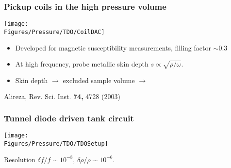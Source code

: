 \begin{frame}[label=DACcoil]
\frametitle{Pickup coils in the high pressure volume}

\centerline{\texttt{[image: \\Figures/Pressure/TDO/CoilDAC]}}
\begin{itemize}
\item
Developed for magnetic susceptibility measurements, filling factor $\sim 0.3$

\item
At high frequency, probe metallic skin depth $s \propto
\sqrt{\rho/\omega}$.

\item 
Skin depth $\rightarrow$ excluded sample volume $\rightarrow$ \\ 
\end{itemize}


\vspace*{\fill}
\centerline{\makebox[\linewidth]{\rule{0.85\textwidth}{0.4pt}}}
\centerline{\scriptsize Alireza, Rev. Sci. Inst. {\bf 74,} 4728 (2003)}

\end{frame}

\begin{frame}[label=DACTDO]
\frametitle{Tunnel diode driven tank circuit}

\centerline{\texttt{[image: \\Figures/Pressure/TDO/TDOSetup]}}

\centerline{Resolution $\delta f/f \sim 10^{-8}$,  $\delta \rho/\rho \sim 10^{-6}$.}
\end{frame}
 
